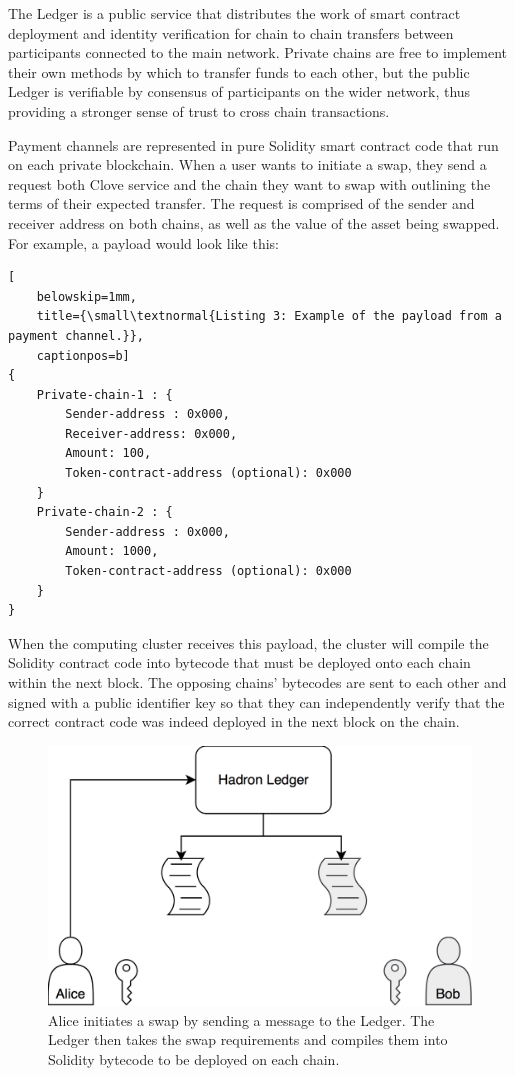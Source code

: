 \documentclass{%
	article}
\begin{document}
The Ledger is a public service that distributes the work of smart contract deployment and identity verification for chain to chain transfers between participants connected to the main network. Private chains are free to implement their own methods by which to transfer funds to each other, but the public Ledger is verifiable by consensus of participants on the wider network\cite{raftconsensus}, thus providing a stronger sense of trust to cross chain transactions.

Payment channels are represented in pure Solidity smart contract code that run on each private blockchain. When a user wants to initiate a swap, they send a request both Clove service and the chain they want to swap with outlining the terms of their expected transfer. The request is comprised of the sender and receiver address on both chains, as well as the value of the asset being swapped. For example, a payload would look like this:

\begin{lstlisting}[
	belowskip=1mm,
	title={\small\textnormal{Listing 3: Example of the payload from a payment channel.}},
	captionpos=b]
{
    Private-chain-1 : {
        Sender-address : 0x000,
        Receiver-address: 0x000,
        Amount: 100,
        Token-contract-address (optional): 0x000
    }
    Private-chain-2 : {
        Sender-address : 0x000,
        Amount: 1000,
        Token-contract-address (optional): 0x000
    }
}
\end{lstlisting}

When the computing cluster receives this payload, the cluster will compile the Solidity contract code into bytecode that must be deployed onto each chain within the next block. The opposing chains’ bytecodes are sent to each other and signed with a public identifier key so that they can independently verify that the correct contract code was indeed deployed in the next block on the chain.

\begin{figure}[H]
\centering
\includegraphics[scale=0.112]{fig1.png}
\caption{\small\textnormal{Alice initiates a swap by sending a message to the Ledger. The Ledger then takes the swap requirements and compiles them into Solidity bytecode to be deployed on each chain.}}
\end{figure}
\end{document}

